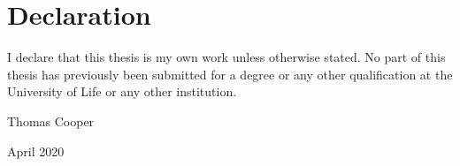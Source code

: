 \chapter*{Declaration}

I declare that this thesis is my own work unless otherwise stated. No part of this thesis
has previously been submitted for a degree or any other qualification at the University
of Life or any other institution.

Thomas Cooper

April 2020
